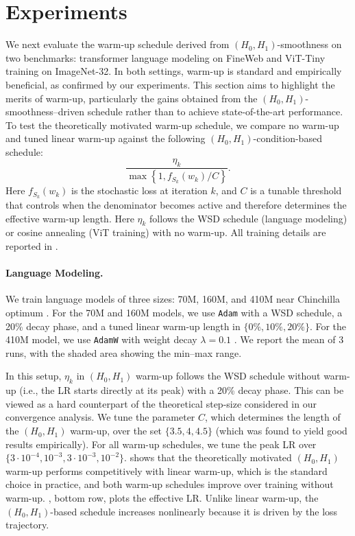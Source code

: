 \documentclass[a4paper,11pt]{article}
\newcommand{\algname}[1]{\texttt{#1}}
\newcommand{\1}{\mathbbm{1}}
\theoremstyle{plain}
\begin{document}
\section{Experiments}\label{sec:experiments_main}

We next evaluate the warm-up schedule derived from $(H_0,H_1)$-smoothness on two benchmarks: transformer language modeling on FineWeb and ViT-Tiny training
on ImageNet-32. In both settings, warm-up is standard and empirically beneficial, as confirmed by our experiments.  This section aims to highlight the merits of warm-up, particularly the gains obtained from the $(H_0, H_1)$-smoothness–driven schedule rather than to achieve state-of-the-art performance. To test the theoretically motivated warm-up schedule, we compare no warm-up and tuned linear warm-up against the following $(H_0, H_1)$-condition-based schedule: $$\frac{\eta_k}{\max\left\{1, f_{S_k}(w_k)/C\right\}}.$$ Here $f_{S_k}(w_k)$ is the stochastic loss at iteration $k$, and $C$ is a tunable threshold that controls when the denominator becomes active and therefore determines the effective warm-up length. Here $\eta_k$ follows the WSD schedule (language modeling) or cosine annealing (ViT training) with no warm-up. All training details are reported in .


\paragraph{Language Modeling.}
 
We train language models of three sizes: 70M, 160M, and 410M near Chinchilla optimum \citep{hoffmann2022chinchilla}. For the 70M and 160M models, we use \algname{Adam} with a WSD schedule, a 20\% decay phase, and a tuned linear warm-up length in $\{0\%,10\%,20\%\}$. For the 410M model, we use \algname{AdamW} with weight decay $\lambda=0.1$ \citep{loshchilov2017decoupled}. We report the mean of 3 runs, with the shaded area showing the min–max range.

In this setup, $\eta_k$ in $(H_0, H_1)$ warm-up follows the WSD schedule without warm-up (i.e., the LR starts directly at its peak) with a 20\% decay phase. This can be viewed as a hard counterpart of the theoretical step-size considered in our convergence analysis. We tune the parameter $C$, which determines the length of the $(H_0, H_1)$ warm-up, over the set $\{3.5, 4, 4.5\}$ (which was found to yield good results empirically). For all warm-up schedules, we tune the peak LR over $\{3 \cdot 10^{-4}, 10^{-3}, 3 \cdot 10^{-3}, 10^{-2}\}$.  shows that the theoretically motivated $(H_0, H_1)$ warm-up performs competitively with linear warm-up, which is the standard choice in practice, and both warm-up schedules improve over training without warm-up. , bottom row, plots the effective LR. Unlike linear warm-up, the $(H_0, H_1)$-based schedule increases nonlinearly because it is driven by the loss trajectory.
\end{document}

